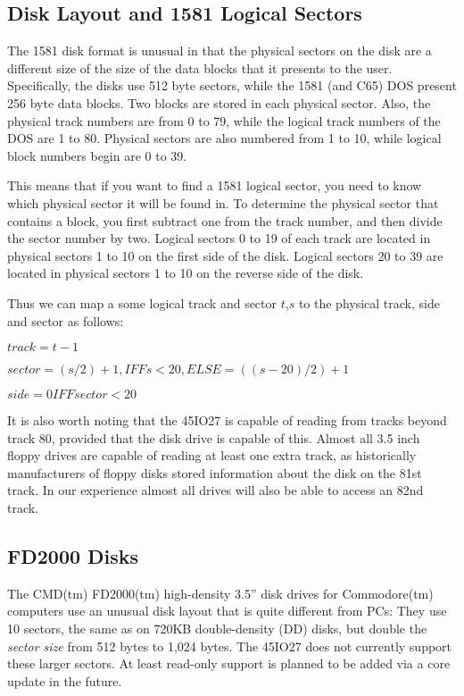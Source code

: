 \subsection{Disk Layout and 1581 Logical Sectors}

The 1581 disk format is unusual in that the physical sectors on the
disk are a different size of the size of the data blocks that it
presents to the user.  Specifically, the disks use 512 byte sectors,
while the 1581 (and C65) DOS present 256 byte data blocks.
Two blocks are stored in each physical sector.  Also, the physical
track numbers are from 0 to 79, while the logical track numbers of the
DOS are 1 to 80.  Physical sectors are also numbered from 1 to 10,
while logical block numbers begin are 0 to 39.

This means that if you want to find a 1581 logical sector, you need to
know which physical sector it will be found in.  To determine the
physical sector that contains a block, you first subtract one from the
track number, and then divide the sector number by two.  Logical
sectors 0 to 19 of each track are located in physical sectors 1 to 10
on the first side of the disk.  Logical sectors 20 to 39 are 
located in physical sectors 1 to 10 on the reverse side of the disk.  

Thus we can map a some logical track and sector $t$,$s$ to the
physical track, side and sector as follows:

$track = t - 1$

$sector = (s/2)+1, IFF s < 20, ELSE = ((s-20)/2) + 1$

$side = 0 IFF sector < 20$

It is also worth noting that the 45IO27 is capable of reading from
tracks beyond track 80, provided that the disk drive is capable of
this.  Almost all 3.5 inch floppy drives are capable of reading at
least one extra track, as historically manufacturers of floppy disks
stored information about the disk on the 81st track.  In our
experience almost all drives will also be able to access an 82nd
track.

\subsection{FD2000 Disks}

The CMD(tm) FD2000(tm) high-density 3.5'' disk drives for Commodore(tm) computers
use an unusual disk layout that is quite different from PCs: They use 10 sectors,
the same as on 720KB double-density (DD) disks, but double the {\em sector size}
from 512 bytes to 1,024 bytes.  The 45IO27 does not currently support these
larger sectors. At least read-only support is planned to be added via a core update
in the future.

